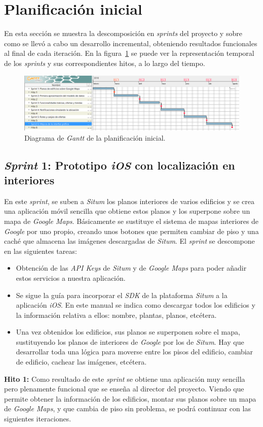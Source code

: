 \section{Planificación inicial}
En esta sección se muestra la descomposición en \textit{sprints} del proyecto y sobre como se llevó a cabo un desarrollo incremental, obteniendo resultados funcionales al final de cada iteración.
En la figura~\ref{fig:gantt_inicial} se puede ver la representación temporal de los \textit{sprints} y sus correspondientes hitos, a lo largo del tiempo.
\begin{figure}[tbp]
\begin{center}
\includegraphics[scale=0.5]{figures/ganrr.png}
\caption{Diagrama de \textit{Gantt} de la planificación inicial.
\label{fig:gantt_inicial}}
\end{center}
\end{figure}

\subsection{\textit{Sprint} 1: Prototipo \textit{iOS} con localización en interiores}
En este \textit{sprint}, se suben a \textit{Situm} los planos interiores de varios edificios y se crea una aplicación móvil sencilla que obtiene estos planos y los superpone sobre un mapa de \textit{Google Maps}. Básicamente se sustituye el sistema de mapas interiores de \textit{Google} por uno propio, creando unos botones que permiten cambiar de piso y una caché que almacena las imágenes descargadas de \textit{Situm}. El \textit{sprint} se descompone en las siguientes tareas:
\begin{itemize}
\item Obtención de las \textit{API Keys} de \textit{Situm} y de \textit{Google Maps} para poder añadir estos servicios a nuestra aplicación.
\item Se sigue la guía para incorporar el \textit{SDK} de la plataforma \textit{Situm} a la aplicación \textit{iOS}. En este manual se indica como descargar todos los edificios y la información relativa a ellos: nombre, plantas, planos, etcétera.
\item Una vez obtenidos los edificios, sus planos se superponen sobre el mapa, sustituyendo los planos de interiores de \textit{Google} por los de \textit{Situm}. Hay que desarrollar toda una lógica para moverse entre los pisos del edificio, cambiar de edificio, cachear las imágenes, etcétera.
\end{itemize}
\textbf{Hito 1:} Como resultado de este \textit{sprint} se obtiene una aplicación muy sencilla pero plenamente funcional que se enseña al director del proyecto. Viendo que permite obtener la información de los edificios, montar sus planos sobre un mapa de \textit{Google Maps}, y que cambia de piso sin problema, se podrá continuar con las siguientes iteraciones.

